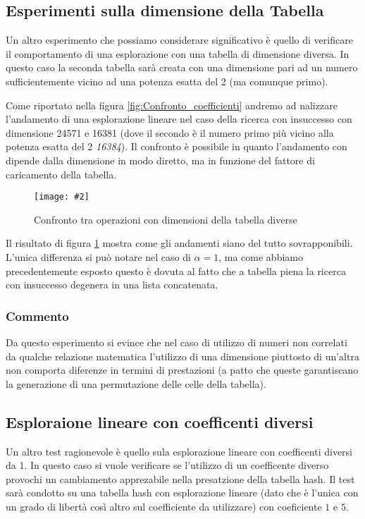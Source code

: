 \documentclass{article}
\newcommand{\image}[3][1]{
	\centering
	\texttt{[image: \#2]}
	\caption{#3}
}
\begin{document}
\subsection{Esperimenti sulla dimensione della Tabella}
Un altro esperimento che possiamo considerare significativo è quello di verificare il comportamento di una esplorazione con una tabella di dimensione diversa. In questo caso la seconda tabella sarà creata con una dimensione pari ad un numero sufficientemente vicino ad una potenza esatta del 2 (ma comunque primo).

Come riportato nella figura \ref{fig:Confronto_coefficienti} andremo ad nalizzare l'andamento di una esplorazione lineare nel caso della ricerca con insuccesso con dimensione 24571 e 16381 (dove il secondo è il numero primo più vicino alla potenza esatta del 2 \emph{16384}). Il confronto è possibile in quanto l'andamento con dipende dalla dimensione in modo diretto, ma in funzione del fattore di caricamento della tabella.

\begin{figure}[H]
\image[0.75]{Insuccesso_Confronto_Lineare_d24571_d16381_scala_logaritmica_suffisso}{Confronto tra operazioni con dimensioni della tabella diverse}
\label{fig:Confronto_dimensioni}
\end{figure}

Il risultato di figura \ref{fig:Confronto_dimensioni} mostra come gli andamenti siano del tutto sovrapponibili. L'unica differenza si può notare nel caso di $\alpha = 1$, ma come abbiamo precedentemente esposto questo è dovuta al fatto che a tabella piena la ricerca con insuccesso degenera in una lista concatenata.

\subsubsection{Commento}
Da questo esperimento si evince che nel caso di utilizzo di numeri non correlati da qualche relazione matematica l'utilizzo di una dimensione piuttosto di un'altra non comporta diferenze in termini di prestazioni (a patto che queste garantiscano la generazione di una permutazione delle celle della tabella).

\subsection{Esploraione lineare con coefficenti diversi}
Un altro test ragionevole è quello sula esplorazione lineare con coefficenti diversi da 1. In questo caso si vuole verificare se l'utilizzo di un coefficente diverso provochi un cambiamento apprezabile nella presatzione della tabella hash. Il test sarà condotto su una tabella hash con esplorazione lineare (dato che è l'unica con un grado di libertà così altro sul coefficiente da utilizzare) con coeficiente $1$ e $5$.
\end{document}

